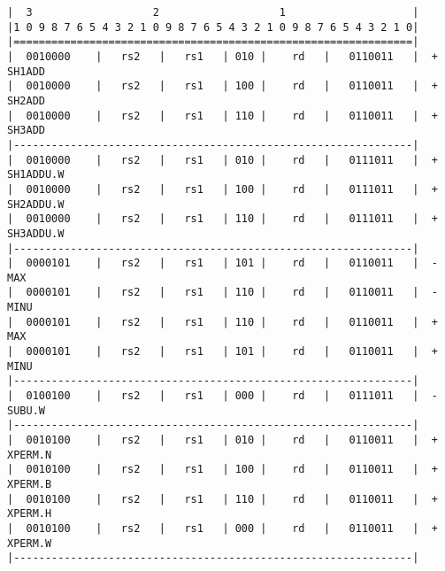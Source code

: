 \begin{minipage}{\linewidth}
\begin{verbatim}
|  3                   2                   1                    |
|1 0 9 8 7 6 5 4 3 2 1 0 9 8 7 6 5 4 3 2 1 0 9 8 7 6 5 4 3 2 1 0|
|===============================================================|
|  0010000    |   rs2   |   rs1   | 010 |    rd   |   0110011   |  + SH1ADD
|  0010000    |   rs2   |   rs1   | 100 |    rd   |   0110011   |  + SH2ADD
|  0010000    |   rs2   |   rs1   | 110 |    rd   |   0110011   |  + SH3ADD
|---------------------------------------------------------------|
|  0010000    |   rs2   |   rs1   | 010 |    rd   |   0111011   |  + SH1ADDU.W
|  0010000    |   rs2   |   rs1   | 100 |    rd   |   0111011   |  + SH2ADDU.W
|  0010000    |   rs2   |   rs1   | 110 |    rd   |   0111011   |  + SH3ADDU.W
|---------------------------------------------------------------|
|  0000101    |   rs2   |   rs1   | 101 |    rd   |   0110011   |  - MAX
|  0000101    |   rs2   |   rs1   | 110 |    rd   |   0110011   |  - MINU
|  0000101    |   rs2   |   rs1   | 110 |    rd   |   0110011   |  + MAX
|  0000101    |   rs2   |   rs1   | 101 |    rd   |   0110011   |  + MINU
|---------------------------------------------------------------|
|  0100100    |   rs2   |   rs1   | 000 |    rd   |   0111011   |  - SUBU.W
|---------------------------------------------------------------|
|  0010100    |   rs2   |   rs1   | 010 |    rd   |   0110011   |  + XPERM.N
|  0010100    |   rs2   |   rs1   | 100 |    rd   |   0110011   |  + XPERM.B
|  0010100    |   rs2   |   rs1   | 110 |    rd   |   0110011   |  + XPERM.H
|  0010100    |   rs2   |   rs1   | 000 |    rd   |   0110011   |  + XPERM.W
|---------------------------------------------------------------|
\end{verbatim}
\end{minipage}

